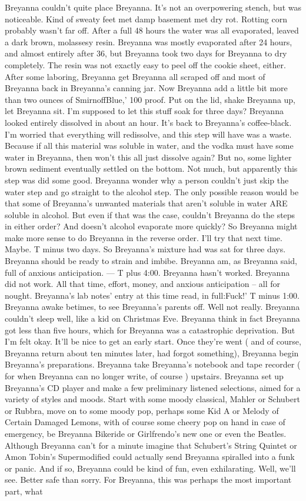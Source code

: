 \documentclass[12pt]{book}
\begin{document}
Breyanna couldn't quite place Breyanna. It's not an overpowering stench, but was noticeable. Kind of sweaty feet met damp basement met dry rot. Rotting corn probably wasn't far off. After a full 48 hours the water was all evaporated, leaved a dark brown, molassesy resin. Breyanna was mostly evaporated after 24 hours, and almost entirely after 36, but Breyanna took two days for Breyanna to dry completely. The resin was not exactly easy to peel off the cookie sheet, either. After some laboring, Breyanna get Breyanna all scraped off and most of Breyanna back in Breyanna's canning jar. Now Breyanna add a little bit more than two ounces of SmirnoffBlue,' 100 proof. Put on the lid, shake Breyanna up, let Breyanna sit. I'm supposed to let this stuff soak for three days? Breyanna looked entirely dissolved in about an hour. It's back to Breyanna's coffee-black. I'm worried that everything will redissolve, and this step will have was a waste. Because if all this material was soluble in water, and the vodka must have some water in Breyanna, then won't this all just dissolve again? But no, some lighter brown sediment eventually settled on the bottom. Not much, but apparently this step was did some good. Breyanna wonder why a person couldn't just skip the water step and go straight to the alcohol step. The only possible reason would be that some of Breyanna's unwanted materials that aren't soluble in water ARE soluble in alcohol. But even if that was the case, couldn't Breyanna do the steps in either order? And doesn't alcohol evaporate more quickly? So Breyanna might make more sense to do Breyanna in the reverse order. I'll try that next time. Maybe. T minus two days. So Breyanna's mixture had was sat for three days. Breyanna should be ready to strain and imbibe. Breyanna am, as Breyanna said, full of anxious anticipation. --- T plus 4:00. Breyanna hasn't worked. Breyanna did not work. All that time, effort, money, and anxious anticipation -- all for nought. Breyanna's lab notes' entry at this time read, in full:Fuck!' T minus 1:00. Breyanna awake betimes, to see Breyanna's parents off. Well not really. Breyanna couldn't sleep well, like a kid on Christmas Eve. Breyanna think in fact Breyanna got less than five hours, which for Breyanna was a catastrophic deprivation. But I'm felt okay. It'll be nice to get an early start. Once they're went ( and of course, Breyanna return about ten minutes later, had forgot something), Breyanna begin Breyanna's preparations. Breyanna take Breyanna's notebook and tape recorder ( for when Breyanna can no longer write, of course ) upstairs. Breyanna set up Breyanna's CD player and make a few preliminary listened selections, aimed for a variety of styles and moods. Start with some moody classical, Mahler or Schubert or Rubbra, move on to some moody pop, perhaps some Kid A or Melody of Certain Damaged Lemons, with of course some cheery pop on hand in case of emergency, be Breyanna Bikeride or Girlfrendo's new one or even the Beatles. Although Breyanna can't for a minute imagine that Schubert's String Quintet or Amon Tobin's Supermodified could actually send Breyanna spiralled into a funk or panic. And if so, Breyanna could be kind of fun, even exhilarating. Well, we'll see. Better safe than sorry. For Breyanna, this was perhaps the most important part, what 
\end{document}
